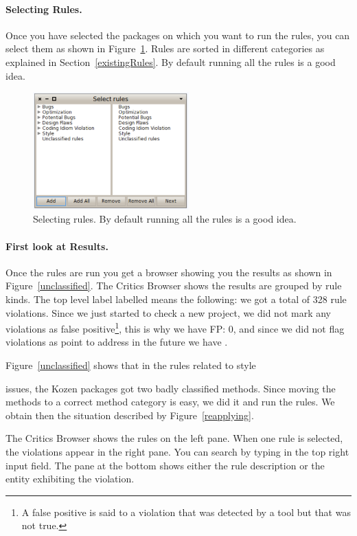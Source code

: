 \documentclass[a4paper,10pt,twoside]{book}
\begin{document}
\paragraph{Selecting Rules.}
Once you have selected the packages on which you want to run the rules, you can select them as shown in Figure~\ref{ruleselection}. Rules are sorted in different categories as explained in Section~\ref{existingRules}. By default running all the rules is a good idea.


\begin{figure}[h]
\centering
\includegraphics[width=6cm]{selectingRules}
\caption{Selecting rules. By default running all the rules is a good idea. \label{ruleselection}}
\end{figure}


\paragraph{First look at Results.} Once the rules are run you get a browser showing you the results as shown in Figure~\ref{unclassified}. 
The Critics Browser shows the results are grouped by rule kinds. 
The top level label labelled  means the following: we got a total of 328 rule violations. Since we just started to check a new project, we did not mark any violations as false positive\footnote{A false positive is said to a violation that was detected by a tool but that was not true.}, this is why we have FP: 0, and since we did not flag violations as point to address in the future we have .


Figure~\ref{unclassified} shows that in the rules related to style

 issues, the Kozen packages got two badly classified methods. Since moving the methods to a correct method category is easy, we did it and run the rules. We obtain then the situation described by Figure~\ref{reapplying}.

The Critics Browser shows the rules on the left pane. When one rule is selected, the violations appear in the right pane. You can search by typing in the top right input field. The pane at the bottom shows either the rule description or the entity exhibiting the violation. 
\end{document}
